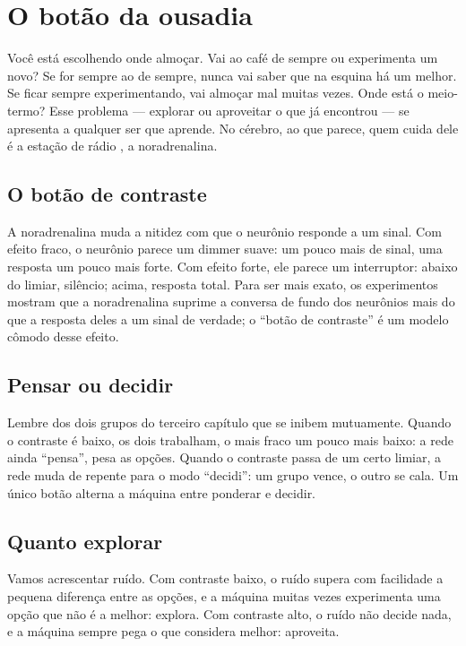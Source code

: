 \chapter{O botão da ousadia}

Você está escolhendo onde almoçar. Vai ao café de sempre ou experimenta um novo? Se for sempre ao de sempre, nunca vai saber que na esquina há um melhor. Se ficar sempre experimentando, vai almoçar mal muitas vezes. Onde está o meio-termo? Esse problema --- explorar ou aproveitar o que já encontrou --- se apresenta a qualquer ser que aprende. No cérebro, ao que parece, quem cuida dele é a estação de rádio , a noradrenalina.

\section*{O botão de contraste}

A noradrenalina muda a nitidez com que o neurônio responde a um sinal. Com efeito fraco, o neurônio parece um dimmer suave: um pouco mais de sinal, uma resposta um pouco mais forte. Com efeito forte, ele parece um interruptor: abaixo do limiar, silêncio; acima, resposta total. Para ser mais exato, os experimentos mostram que a noradrenalina suprime a conversa de fundo dos neurônios mais do que a resposta deles a um sinal de verdade; o ``botão de contraste'' é um modelo cômodo desse efeito.


\section*{Pensar ou decidir}

Lembre dos dois grupos do terceiro capítulo que se inibem mutuamente. Quando o contraste é baixo, os dois trabalham, o mais fraco um pouco mais baixo: a rede ainda ``pensa'', pesa as opções. Quando o contraste passa de um certo limiar, a rede muda de repente para o modo ``decidi'': um grupo vence, o outro se cala. Um único botão alterna a máquina entre ponderar e decidir.

\section*{Quanto explorar}

Vamos acrescentar ruído. Com contraste baixo, o ruído supera com facilidade a pequena diferença entre as opções, e a máquina muitas vezes experimenta uma opção que não é a melhor: explora. Com contraste alto, o ruído não decide nada, e a máquina sempre pega o que considera melhor: aproveita.

